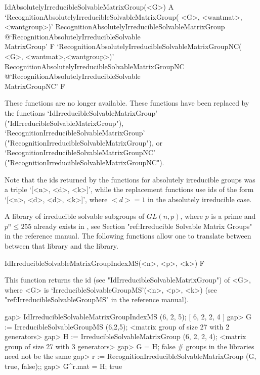 \>IdAbsolutelyIrreducibleSolvableMatrixGroup(<G>) A
\>`RecognitionAbsolutelyIrreducibleSolvableMatrixGroup(%
   <G>, <wantmat>, <wantgroup>)'%
{RecognitionAbsolutelyIrreducibleSolvableMatrixGroup}%
@{`RecognitionAbsolutelyIrreducibleSolvable\\MatrixGroup'} F
\>`RecognitionAbsolutelyIrreducibleSolvableMatrixGroupNC(%
   <G>, <wantmat>,<wantgroup>)'%
{RecognitionAbsolutelyIrreducibleSolvableMatrixGroupNC}%
@{`RecognitionAbsolutelyIrreducibleSolvable\\MatrixGroupNC'} F

These functions are no longer available. These functions have been replaced by the
functions 
`IdIrreducibleSolvableMatrixGroup' ("IdIrreducibleSolvableMatrixGroup"), 
`RecognitionIrreducibleSolvableMatrixGroup' ("RecognitionIrreducibleSolvableMatrixGroup"), or
`RecognitionIrreducibleSolvableMatrixGroupNC' ("RecognitionIrreducibleSolvableMatrixGroupNC").

Note that the ids returned by the functions for absolutely irreducible groups was a triple `[<n>, <d>, <k>]', while the replacement functions use ids of the form `[<n>, <d>, <d>, <k>]', where $<d> = 1$ in the absolutely irreducible case.



A library of irreducible solvable subgroups of $GL(n, p)$, where $p$ is a 
prime and $p^n \leq 255$ already exists in {\GAP}, see Section "ref:Irreducible Solvable Matrix Groups" in the {\GAP} reference manual. The following functions
allow one to translate between between that library and the {\IRREDSOL} library. 


\>IdIrreducibleSolvableMatrixGroupIndexMS(<n>, <p>, <k>) F

This function returns the id (see "IdIrreducibleSolvableMatrixGroup") of <G>, 
where <G> is `IrreducibleSolvableGroupMS'(<n>, <p>, <k>) (see "ref:IrreducibleSolvableGroupMS" in the {\GAP} reference manual).

\beginexample
gap> IdIrreducibleSolvableMatrixGroupIndexMS (6, 2, 5);
[ 6, 2, 2, 4 ]
gap> G := IrreducibleSolvableGroupMS (6,2,5);
<matrix group of size 27 with 2 generators>
gap> H := IrreducibleSolvableMatrixGroup (6, 2, 2, 4);
<matrix group of size 27 with 3 generators>
gap> G = H;
false # groups in the libraries need not be the same
gap> r := RecognitionIrreducibleSolvableMatrixGroup (G, true, false);;
gap> G^r.mat = H;
true
\endexample


